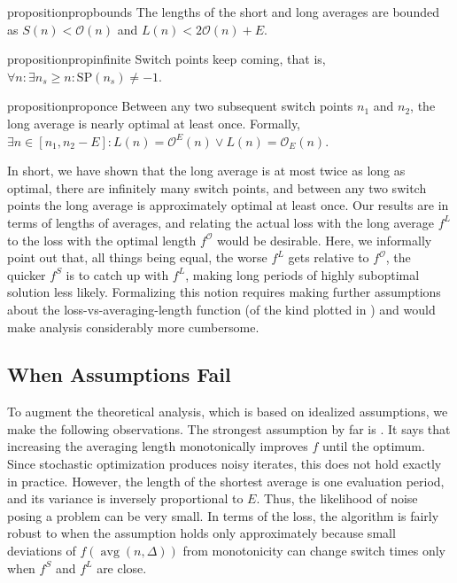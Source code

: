 \documentclass[twocolumn]{article}
\DeclareMathOperator*{\avg}{avg}
\newcommand*{\SP}{\mathrm{SP}}
\newcommand{\OL}{\mathcal{O}}
\begin{document}
\begin{restatable}{proposition}{propbounds}
\label{prop:bounds}
The lengths of the short and long averages are bounded as $S(n) < \OL(n)$ and $L(n) < 2\OL(n) + E$.
\end{restatable}
\ifdef{\groundskip}{\vspace*{-\groundskip}}{}

\begin{restatable}{proposition}{propinfinite}
\label{prop:infinite-switch-points}
Switch points keep coming, that is, $\forall n \colon \exists n_s \geq n \colon \SP(n_s) \neq -1$.
\end{restatable}
\ifdef{\groundskip}{\vspace*{-\groundskip}}{}

\begin{restatable}{proposition}{proponce}
\label{prop:once-in-a-while-optimality}
Between any two subsequent switch points $n_1$ and $n_2$, the long average is nearly optimal at least once.
Formally, $\exists n \in  [n_1, n_2-E] \colon L(n) = \OL^E(n) \lor L(n) = \OL_E(n)$.
\end{restatable}

In short, we have shown that the long average is at most twice as long as optimal, there are infinitely many switch points, and between any two switch points the long average is approximately optimal at least once.
Our results are in terms of lengths of averages, and relating the actual loss with the long average $f^L$ to the loss with the optimal length $f^{\OL}$ would be desirable.
Here, we informally point out that, all things being equal, the worse $f^L$ gets relative to $f^{\OL}$, the quicker $f^S$ is to catch up with $f^L$, making long periods of highly suboptimal solution less likely.
Formalizing this notion requires making further assumptions about the loss-vs-averaging-length function (of the kind plotted in ) and would make analysis considerably more cumbersome.

\subsection{When Assumptions Fail}
\label{sec:tta-failed-assumptions}

To augment the theoretical analysis, which is based on idealized assumptions, we make the following observations.
The strongest assumption by far is .
It says that increasing the averaging length monotonically improves $f$ until the optimum.
Since stochastic optimization produces noisy iterates, this does not hold exactly in practice.
However, the length of the shortest average is one evaluation period, and its variance is inversely proportional to $E$.
Thus, the likelihood of noise posing a problem can be very small.
In terms of the loss, the algorithm is fairly robust to when the assumption holds only approximately because small deviations of $f(\avg(n,\Delta))$ from monotonicity can change switch times only when $f^S$ and $f^L$ are close.
\end{document}
